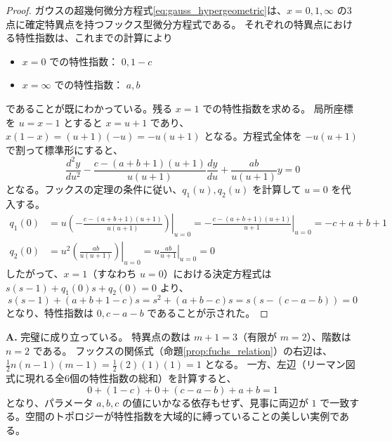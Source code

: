 \begin{proof}
    ガウスの超幾何微分方程式\eqref{eq:gauss_hypergeometric}は、$x=0, 1, \infty$ の3点に確定特異点を持つフックス型微分方程式である。
    それぞれの特異点における特性指数は、これまでの計算により
    \begin{itemize}
        \item $x=0$ での特性指数： $0, 1-c$
        \item $x=\infty$ での特性指数： $a, b$
    \end{itemize}
    であることが既にわかっている。残る $x=1$ での特性指数を求める。
    局所座標を $u = x-1$ とすると $x = u+1$ であり、$x(1-x) = (u+1)(-u) = -u(u+1)$ となる。方程式全体を $-u(u+1)$ で割って標準形にすると、
    \[
    \frac{d^{2}y}{du^{2}} - \frac{c - (a+b+1)(u+1)}{u(u+1)} \frac{dy}{du} + \frac{ab}{u(u+1)} y = 0
    \]
    となる。フックスの定理の条件に従い、$q_{1}(u), q_{2}(u)$ を計算して $u=0$ を代入する。
    \begin{align*}
        q_{1}(0) &= \left. u \left( - \frac{c - (a+b+1)(u+1)}{u(u+1)} \right) \right|_{u=0} = \left. - \frac{c - (a+b+1)(u+1)}{u+1} \right|_{u=0} = -c + a + b + 1 \\
        q_{2}(0) &= \left. u^{2} \left( \frac{ab}{u(u+1)} \right) \right|_{u=0} = \left. u \frac{ab}{u+1} \right|_{u=0} = 0
    \end{align*}
    したがって、$x=1$（すなわち $u=0$）における決定方程式は $s(s-1) + q_{1}(0)s + q_{2}(0) = 0$ より、
    \[
    s(s-1) + (a+b+1-c)s = s^{2} + (a+b-c)s = s(s - (c-a-b)) = 0
    \]
    となり、特性指数は $0, c-a-b$ であることが示された。
\end{proof}

\begin{Q}
\textbf{A.} 完璧に成り立っている。
特異点の数は $m+1 = 3$（有限が $m=2$）、階数は $n=2$ である。
フックスの関係式（命題\ref{prop:fuchs_relation}）の右辺は、$\frac{1}{2}n(n-1)(m-1) = \frac{1}{2}(2)(1)(1) = 1$ となる。
一方、左辺（リーマン図式に現れる全6個の特性指数の総和）を計算すると、
\[
0 + (1-c) + 0 + (c-a-b) + a + b = 1
\]
となり、パラメータ $a, b, c$ の値にいかなる依存もせず、見事に両辺が $1$ で一致する。空間のトポロジーが特性指数を大域的に縛っていることの美しい実例である。
\end{Q}

